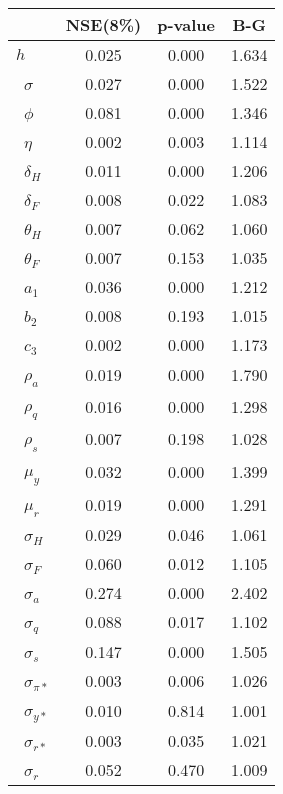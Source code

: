 \begin{tiny}\begin{tabular}{lccc}
\hline
&\textbf{NSE(8\%)}&\textbf{p-value}&\textbf{B-G}\\\hline
\textbf{$ h             $}&0.025&0.000&1.634\\\
\textbf{$ \sigma        $}&0.027&0.000&1.522\\\
\textbf{$ \phi          $}&0.081&0.000&1.346\\\
\textbf{$ \eta          $}&0.002&0.003&1.114\\\
\textbf{$ \delta_{H}    $}&0.011&0.000&1.206\\\
\textbf{$ \delta_{F}    $}&0.008&0.022&1.083\\\
\textbf{$ \theta_{H}    $}&0.007&0.062&1.060\\\
\textbf{$ \theta_{F}    $}&0.007&0.153&1.035\\\
\textbf{$ a_{1}         $}&0.036&0.000&1.212\\\
\textbf{$ b_{2}         $}&0.008&0.193&1.015\\\
\textbf{$ c_{3}         $}&0.002&0.000&1.173\\\
\textbf{$ \rho_{a}      $}&0.019&0.000&1.790\\\
\textbf{$ \rho_{q}      $}&0.016&0.000&1.298\\\
\textbf{$ \rho_{s}      $}&0.007&0.198&1.028\\\
\textbf{$ \mu_{y}       $}&0.032&0.000&1.399\\\
\textbf{$ \mu_{r}       $}&0.019&0.000&1.291\\\
\textbf{$ \sigma_{H}    $}&0.029&0.046&1.061\\\
\textbf{$ \sigma_{F}    $}&0.060&0.012&1.105\\\
\textbf{$ \sigma_{a}    $}&0.274&0.000&2.402\\\
\textbf{$ \sigma_{q}    $}&0.088&0.017&1.102\\\
\textbf{$ \sigma_{s}    $}&0.147&0.000&1.505\\\
\textbf{$ \sigma_{\pi*} $}&0.003&0.006&1.026\\\
\textbf{$ \sigma_{y*}   $}&0.010&0.814&1.001\\\
\textbf{$ \sigma_{r*}   $}&0.003&0.035&1.021\\\
\textbf{$ \sigma_{r}    $}&0.052&0.470&1.009\\\hline
\end{tabular}
\end{tiny}
